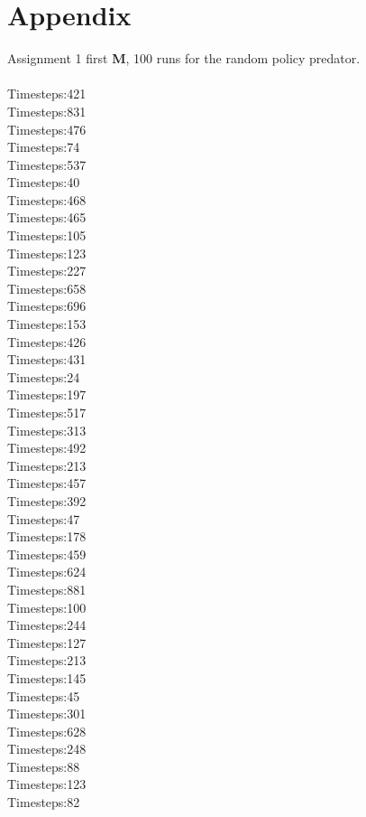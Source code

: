 \documentclass{article}
\begin{document}
\section{Appendix}
Assignment 1 first \textbf{M}, 100 runs for the random policy predator.\\\\
Timesteps:421\\
Timesteps:831\\
Timesteps:476\\
Timesteps:74\\
Timesteps:537\\
Timesteps:40\\
Timesteps:468\\
Timesteps:465\\
Timesteps:105\\
Timesteps:123\\
Timesteps:227\\
Timesteps:658\\
Timesteps:696\\
Timesteps:153\\
Timesteps:426\\
Timesteps:431\\
Timesteps:24\\
Timesteps:197\\
Timesteps:517\\
Timesteps:313\\
Timesteps:492\\
Timesteps:213\\
Timesteps:457\\
Timesteps:392\\
Timesteps:47\\
Timesteps:178\\
Timesteps:459\\
Timesteps:624\\
Timesteps:881\\
Timesteps:100\\
Timesteps:244\\
Timesteps:127\\
Timesteps:213\\
Timesteps:145\\
Timesteps:45\\
Timesteps:301\\
Timesteps:628\\
Timesteps:248\\
Timesteps:88\\
Timesteps:123\\
Timesteps:82\\
\end{document}
